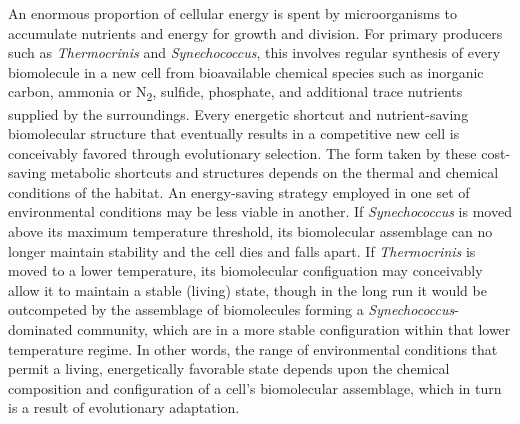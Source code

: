 An enormous proportion of cellular energy is spent by microorganisms to accumulate nutrients and energy for growth and division. For primary producers such as \textit{Thermocrinis} and \textit{Synechococcus}, this involves regular synthesis of every biomolecule in a new cell from bioavailable chemical species such as inorganic carbon, ammonia or N\textsubscript{2}, sulfide, phosphate, and additional trace nutrients supplied by the surroundings. Every energetic shortcut and nutrient-saving biomolecular structure that eventually results in a competitive new cell is conceivably favored through evolutionary selection. The form taken by these cost-saving metabolic shortcuts and structures depends on the thermal and chemical conditions of the habitat. An energy-saving strategy employed in one set of environmental conditions may be less viable in another. If \textit{Synechococcus} is moved above its maximum temperature threshold, its biomolecular assemblage can no longer maintain stability and the cell dies and falls apart. If \textit{Thermocrinis} is moved to a lower temperature, its biomolecular configuation may conceivably allow it to maintain a stable (living) state, though in the long run it would be outcompeted by the assemblage of biomolecules forming a \textit{Synechococcus}-dominated community, which are in a more stable configuration within that lower temperature regime. In other words, the range of environmental conditions that permit a living, energetically favorable state depends upon the chemical composition and configuration of a cell's biomolecular assemblage, which in turn is a result of evolutionary adaptation.

